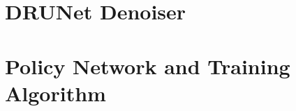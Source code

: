 \section{DRUNet Denoiser}
\label{sec:drunet}



%



\section{Policy Network and Training Algorithm}
\label{sec:policy-network}

